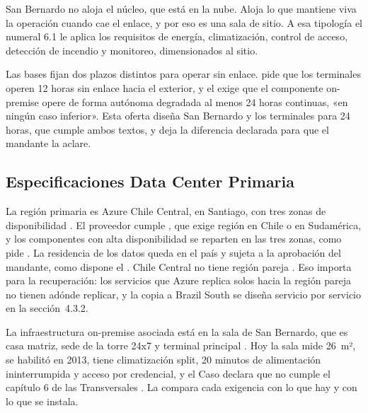 San Bernardo no aloja el núcleo, que está en la nube. Aloja lo que mantiene viva la operación cuando
cae el enlace, y por eso es una sala de sitio. A esa tipología el numeral 6.1 le aplica los requisitos
de energía, climatización, control de acceso, detección de incendio y monitoreo, dimensionados al sitio.

Las bases fijan dos plazos distintos para operar sin enlace.  pide que los
terminales operen 12 horas sin enlace hacia el exterior, y el  exige que el componente
on-premise opere de forma autónoma degradada al menos 24 horas continuas, «en ningún caso inferior». Esta
oferta diseña San Bernardo y los terminales para 24 horas, que cumple ambos textos, y deja la diferencia
declarada para que el mandante la aclare.

\subsection{Especificaciones Data Center Primaria}\label{sec:4-dc-primario}

La región primaria es Azure Chile Central, en Santiago, con tres zonas de disponibilidad
\parencite{ms_regions}. El proveedor cumple , que exige región en Chile o en
Sudamérica, y los componentes con alta disponibilidad se reparten en las tres zonas, como pide
. La residencia de los datos queda en el país y sujeta a la aprobación del mandante,
como dispone el . Chile Central no tiene región pareja \parencite{ms_regions}. Eso importa
para la recuperación: los servicios que Azure replica solos hacia la región pareja no tienen adónde
replicar, y la copia a Brazil South se diseña servicio por servicio en la sección~4.3.2.

La infraestructura on-premise asociada está en la sala de San Bernardo, que es casa matriz, sede de la
torre 24x7 y terminal principal . Hoy la sala mide 26~m², se habilitó en 2013,
tiene climatización split, 20 minutos de alimentación ininterrumpida y acceso por credencial, y el Caso
declara que no cumple el capítulo 6 de las Transversales . La
 compara cada exigencia con lo que hay y con lo que se instala.

